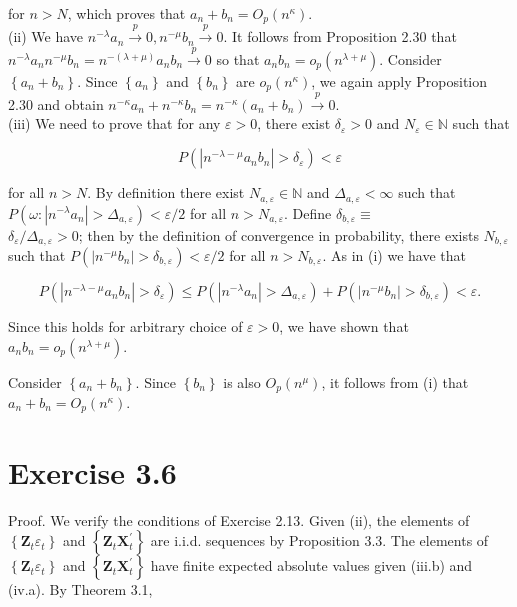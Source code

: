 \documentclass[10pt]{article}
\begin{document}
for $n>N$, which proves that $a_{n}+b_{n}=O_{p}\left(n^{\kappa}\right)$.\\
(ii) We have $n^{-\lambda} a_{n} \xrightarrow{p} 0, n^{-\mu} b_{n} \xrightarrow{p} 0$. It follows from Proposition 2.30 that $n^{-\lambda} a_{n} n^{-\mu} b_{n}=n^{-(\lambda+\mu)} a_{n} b_{n} \xrightarrow{p} 0$ so that $a_{n} b_{n}=o_{p}\left(n^{\lambda+\mu}\right)$. Consider $\left\{a_{n}+b_{n}\right\}$. Since $\left\{a_{n}\right\}$ and $\left\{b_{n}\right\}$ are $o_{p}\left(n^{\kappa}\right)$, we again apply Proposition 2.30 and obtain $n^{-\kappa} a_{n}+n^{-\kappa} b_{n}=n^{-\kappa}\left(a_{n}+b_{n}\right) \xrightarrow{p} 0$.\\
(iii) We need to prove that for any $\varepsilon>0$, there exist $\delta_{\varepsilon}>0$ and $N_{\varepsilon} \in \mathbb{N}$ such that

$$
P\left(\left|n^{-\lambda-\mu} a_{n} b_{n}\right|>\delta_{\varepsilon}\right)<\varepsilon
$$

for all $n>N$. By definition there exist $N_{a, \varepsilon} \in \mathbb{N}$ and $\Delta_{a, \varepsilon}<\infty$ such that $P\left(\omega:\left|n^{-\lambda} a_{n}\right|>\Delta_{a, \varepsilon}\right)<\varepsilon / 2$ for all $n>N_{a, \varepsilon}$. Define $\delta_{b, \varepsilon} \equiv$\\
$\delta_{\varepsilon} / \Delta_{a, \varepsilon}>0$; then by the definition of convergence in probability, there exists $N_{b, \varepsilon}$ such that $P\left(\left|n^{-\mu} b_{n}\right|>\delta_{b, \varepsilon}\right)<\varepsilon / 2$ for all $n>N_{b, \varepsilon}$. As in (i) we have that

$$
P\left(\left|n^{-\lambda-\mu} a_{n} b_{n}\right|>\delta_{\varepsilon}\right) \leq P\left(\left|n^{-\lambda} a_{n}\right|>\Delta_{a, \varepsilon}\right)+P\left(\left|n^{-\mu} b_{n}\right|>\delta_{b, \varepsilon}\right)<\varepsilon .
$$

Since this holds for arbitrary choice of $\varepsilon>0$, we have shown that $a_{n} b_{n}=o_{p}\left(n^{\lambda+\mu}\right)$.

Consider $\left\{a_{n}+b_{n}\right\}$. Since $\left\{b_{n}\right\}$ is also $O_{p}\left(n^{\mu}\right)$, it follows from (i) that $a_{n}+b_{n}=O_{p}\left(n^{\kappa}\right)$.

\section*{Exercise 3.6}
Proof. We verify the conditions of Exercise 2.13. Given (ii), the elements of $\left\{\mathbf{Z}_{t} \varepsilon_{t}\right\}$ and $\left\{\mathbf{Z}_{t} \mathbf{X}_{t}^{\prime}\right\}$ are i.i.d. sequences by Proposition 3.3. The elements of $\left\{\mathbf{Z}_{t} \varepsilon_{t}\right\}$ and $\left\{\mathbf{Z}_{t} \mathbf{X}_{t}^{\prime}\right\}$ have finite expected absolute values given (iii.b) and (iv.a). By Theorem 3.1,
\end{document}
